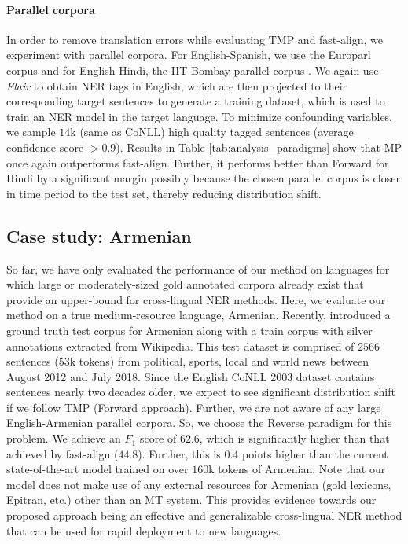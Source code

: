 \documentclass[11pt,a4paper]{article}
\begin{document}
\paragraph{Parallel corpora} 
In order to remove translation errors while evaluating TMP and fast-align, 
we experiment with parallel corpora. 
For English-Spanish, we use the Europarl corpus \cite{koehn2005europarl} 
and for English-Hindi, the IIT Bombay parallel corpus \cite{kunchukuttan2017iit}. 
We again use \textit{Flair} to obtain NER tags in English, 
which are then projected to their corresponding target sentences to generate a training dataset, which is used to train an NER model in the target language. 
To minimize confounding variables, 
we sample $14$k (same as CoNLL) high quality tagged sentences 
(average confidence score $>0.9$). 
Results in Table \ref{tab:analysis_paradigms} show 
that MP once again outperforms fast-align. 
Further, it performs better than Forward for Hindi 
by a significant margin possibly because the chosen parallel corpus 
is closer in time period to the test set, thereby reducing distribution shift.



 
\subsection{Case study: Armenian \label{subsec:armenian}}
So far, we have only evaluated the performance of our method on languages 
for which large or moderately-sized gold annotated corpora already exist that provide an upper-bound for cross-lingual NER methods. Here, we evaluate our method on a true medium-resource language, Armenian. 
Recently, \citet{ghukasyan2018pioner} introduced a ground truth test corpus for Armenian
along with a train corpus with silver annotations extracted from Wikipedia. 
This test dataset is comprised of $2566$ sentences ($53$k tokens) 
from political, sports, local and world news 
between August 2012 and July 2018. 
Since the English CoNLL 2003 dataset contains sentences nearly two decades older, 
we expect to see significant distribution shift 
if we follow TMP (Forward approach). 
Further, we are not aware of any large English-Armenian parallel corpora. 
So, we choose the Reverse paradigm for this problem.
We achieve an $F_1$ score of $62.6$, which is significantly higher 
than that achieved by fast-align ($44.8$). 
Further, this is $0.4$ points higher than the current state-of-the-art model 
trained on over $160$k tokens of Armenian. Note that our model does not make use of any external resources for Armenian (gold lexicons, Epitran, etc.) other than an MT system. This provides evidence towards our proposed approach being an effective and generalizable cross-lingual NER method that can be used for rapid deployment to new languages.  
\end{document}
